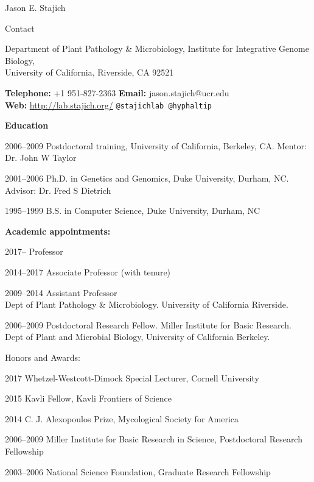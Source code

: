 \documentclass[10pt]{article}
\begin{document}
\begin{cv}{\centerline{Jason E. Stajich}}


\setlength{\cvlabelwidth}{18mm}
\begin{cvlistcompact}{Contact}
\item{Department of Plant Pathology \& Microbiology, Institute for
  Integrative Genome Biology, \\
  University of California, Riverside, CA 92521}
  \item{ \textbf{Telephone:} +1 951-827-2363 \textbf{Email:}
    jason.stajich@ucr.edu \\
    \textbf{Web:} \url{http://lab.stajich.org/} {\tt @stajichlab @hyphaltip}}
\end{cvlistcompact}

\begin{cvlistcompact}{\bf Education}
\item [2006--2009] Postdoctoral training, University of California, Berkeley, CA. Mentor: Dr. John W Taylor
\item [2001--2006] Ph.D. in Genetics and Genomics, Duke University, Durham, NC. Advisor: Dr. Fred S Dietrich
\item [1995--1999] B.S. in Computer Science, Duke University, Durham, NC
\end{cvlistcompact}

\begin{cvlistcompact}{\bf Academic appointments:}
\item [2017--] Professor
\item [2014--2017] Associate Professor (with tenure)
\item [2009--2014] Assistant Professor
  \\ Dept of Plant Pathology \& Microbiology. University of California Riverside.
\item [2006--2009] Postdoctoral Research Fellow. Miller Institute for Basic Research. \\
  Dept of Plant and Microbial Biology, University of California
  Berkeley. \\
\end{cvlistcompact}

\begin{cvlistcompact}{Honors and Awards:}
\item [2017] Whetzel-Westcott-Dimock Special Lecturer, Cornell University
\item [2015] Kavli Fellow, Kavli Frontiers of Science
\item [2014] C. J. Alexopoulos Prize, Mycological Society for America
\item [2006--2009] Miller Institute for Basic Research in Science,
  Postdoctoral Research Fellowship
\item [2003--2006] National Science Foundation, Graduate Research Fellowship
\end{cvlistcompact}


\end{cv}
\end{document}
